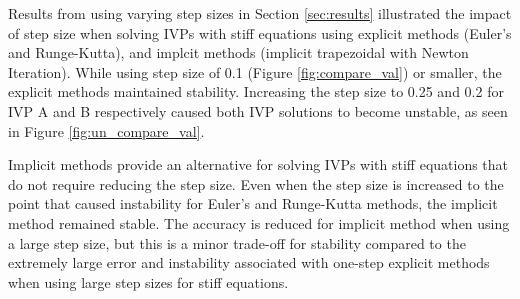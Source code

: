 \documentclass{article}
\begin{document}
Results from using varying step sizes in Section \ref{sec:results} illustrated the impact of step size when solving IVPs with stiff equations using explicit methods (Euler's and Runge-Kutta), and implcit methods (implicit trapezoidal with Newton Iteration). While using step size of 0.1 (Figure \ref{fig:compare_val}) or smaller, the explicit methods maintained stability. Increasing the step size to 0.25 and 0.2 for IVP A and B respectively caused both IVP solutions to become unstable, as seen in Figure \ref{fig:un_compare_val}.

Implicit methods provide an alternative for solving IVPs with stiff equations that do not require reducing the step size. Even when the step size is increased to the point that caused instability for Euler's and Runge-Kutta methods, the implicit method remained stable. The accuracy is reduced for implicit method when using a large step size, but this is a minor trade-off for stability compared to the extremely large error and instability associated with one-step explicit methods when using large step sizes for stiff equations.
\end{document}
